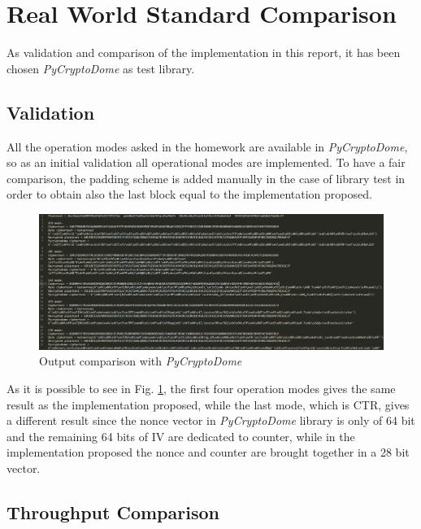 \documentclass{article}
\begin{document}

\section{Real World Standard Comparison}

As validation and comparison of the implementation in this report, it has been chosen \textit{PyCryptoDome} as test library. 

\subsection{Validation}

All the operation modes asked in the homework are available in \textit{PyCryptoDome}, so as an initial validation all operational modes are implemented. To have a fair comparison, the padding scheme is added manually in the case of library test in order to obtain also the last block equal to the implementation proposed. 

\begin{figure}[H]
\centering
\includegraphics[width=1\linewidth]{images/output_comparison.png}
\caption{Output comparison with  \textit{PyCryptoDome}}
\label{fig:outputComparison}
\end{figure}

As it is possible to see in Fig. \ref{fig:outputComparison}, the first four operation modes gives the same result as the implementation proposed, while the last mode, which is CTR, gives a different result since the nonce vector in \textit{PyCryptoDome} library is only of 64 bit and the remaining 64 bits of IV are dedicated to counter, while in the implementation proposed the nonce and counter are brought together in a 28 bit vector.

\subsection{Throughput Comparison}
\end{document}
